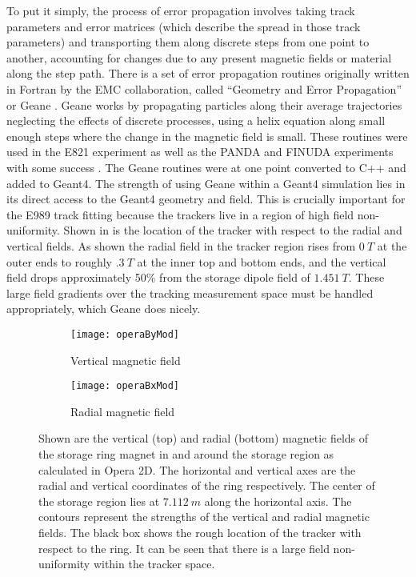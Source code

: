 To put it simply, the process of error propagation involves taking track parameters and error matrices (which describe the spread in those track parameters) and transporting them along discrete steps from one point to another, accounting for changes due to any present magnetic fields or material along the step path. There is a set of error propagation routines originally written in Fortran by the EMC collaboration, called ``Geometry and Error Propagation'' or Geane \cite{geanemanual}. Geane works by propagating particles along their average trajectories neglecting the effects of discrete processes, using a helix equation along small enough steps where the change in the magnetic field is small. These routines were used in the E821 experiment as well as the PANDA and FINUDA experiments with some success \cite{Lavezzi}. The Geane routines were at one point converted to C++ and added to Geant4. The strength of using Geane within a Geant4 simulation lies in its direct access to the Geant4 geometry and field. This is crucially important for the E989 track fitting because the trackers live in a region of high field non-uniformity. Shown in  is the location of the tracker with respect to the radial and vertical fields. As shown the radial field in the tracker region rises from $\SI{0}{T}$ at the outer ends to roughly $\SI{.3}{T}$ at the inner top and bottom ends, and the vertical field drops approximately 50\% from the storage dipole field of $\SI{1.451}{T}$. These large field gradients over the tracking measurement space must be handled appropriately, which Geane does nicely.



\begin{figure}[]
\centering
    \begin{subfigure}[]{0.75\textwidth}
        \centering
        \texttt{[image: operaByMod]}
        \caption{Vertical magnetic field}
    \label{fig:operaBy}
    \end{subfigure}%
    \vspace{5mm}
    \begin{subfigure}[]{0.75\textwidth}
        \centering
        \texttt{[image: operaBxMod]}
        \caption{Radial magnetic field}
    \label{fig:operaBx}
    \end{subfigure}
\caption[Vertical and radial magnetic fields calculated in Opera2D]{Shown are the vertical (top) and radial (bottom) magnetic fields of the storage ring magnet in and around the storage region as calculated in Opera 2D. The horizontal and vertical axes are the radial and vertical coordinates of the ring respectively. The center of the storage region lies at $\SI{7.112}{m}$ along the horizontal axis. The contours represent the strengths of the vertical and radial magnetic fields. The black box shows the rough location of the tracker with respect to the ring. It can be seen that there is a large field non-uniformity within the tracker space.}
\label{fig:Opera2DFields}
\end{figure}


